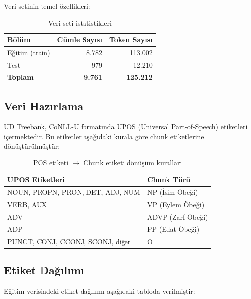 \documentclass[12pt,a4paper]{article}
\begin{document}
Veri setinin temel özellikleri:

\begin{table}[H]
\centering
\caption{Veri seti istatistikleri}
\begin{tabular}{lrr}
\toprule
\textbf{Bölüm} & \textbf{Cümle Sayısı} & \textbf{Token Sayısı} \\
\midrule
Eğitim (train) & 8.782 & 113.002 \\
Test           &   979 &  12.210 \\
\textbf{Toplam} & \textbf{9.761} & \textbf{125.212} \\
\bottomrule
\end{tabular}
\end{table}

\subsection{Veri Hazırlama}

UD Treebank, CoNLL-U formatında UPOS (Universal Part-of-Speech) etiketleri içermektedir.
Bu etiketler aşağıdaki kurala göre chunk etiketlerine dönüştürülmüştür:

\begin{table}[H]
\centering
\caption{POS etiketi $\rightarrow$ Chunk etiketi dönüşüm kuralları}
\begin{tabular}{ll}
\toprule
\textbf{UPOS Etiketleri} & \textbf{Chunk Türü} \\
\midrule
NOUN, PROPN, PRON, DET, ADJ, NUM & NP (İsim Öbeği) \\
VERB, AUX                         & VP (Eylem Öbeği) \\
ADV                               & ADVP (Zarf Öbeği) \\
ADP                               & PP (Edat Öbeği) \\
PUNCT, CONJ, CCONJ, SCONJ, diğer & O \\
\bottomrule
\end{tabular}
\end{table}

\subsection{Etiket Dağılımı}

Eğitim verisindeki etiket dağılımı aşağıdaki tabloda verilmiştir:
\end{document}
